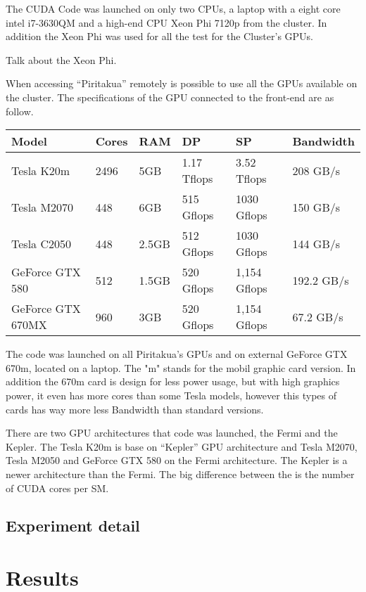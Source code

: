  The CUDA Code was launched on only two CPUs, a laptop with a eight core intel i7-3630QM and a high-end CPU Xeon Phi 7120p from the cluster. In addition the Xeon Phi was used for all the test for the Cluster's GPUs.

 Talk about the Xeon Phi.

 When accessing ``Piritakua'' remotely is possible to use all the GPUs available on the cluster.
 The specifications of the GPU connected to the front-end are as follow.

  \begin{tabular}{ |  l  |  l  |  l  |  l  |  l  | l | }
    \hline
    Model & Cores & RAM & DP & SP & Bandwidth \\
    \hline
    Tesla K20m & 2496 & 5GB & 1.17 Tflops & 3.52 Tflops & 208 GB/s \\
   \hline
    Tesla M2070 & 448 & 6GB & 515 Gflops & 1030 Gflops & 150 GB/s \\
   \hline
     Tesla C2050 & 448 & 2.5GB & 512 Gflops & 1030 Gflops & 144 GB/s \\
   \hline
      GeForce GTX 580 & 512 & 1.5GB & 520 Gflops & 1,154 Gflops & 192.2 GB/s \\
   \hline
   GeForce GTX 670MX & 960 & 3GB & 520 Gflops & 1,154 Gflops & 67.2 GB/s \\
   \hline
  \end{tabular}

   The code was launched on all Piritakua's GPUs and on external GeForce GTX 670m, located on a laptop. The "m" stands for the mobil graphic card version. In addition the 670m card is design for less power usage, but with high graphics power, it even has more cores than some Tesla models, however this types of cards has way more less Bandwidth than standard versions.

There are two GPU architectures that code was launched, the Fermi and the Kepler. The Tesla K20m is base on ``Kepler'' GPU architecture and Tesla M2070, Tesla M2050 and GeForce GTX 580 on the Fermi architecture. The Kepler is a newer architecture than the Fermi. The big difference between the is the number of CUDA cores per SM.


 \subsection{Experiment detail}

\section{Results}

